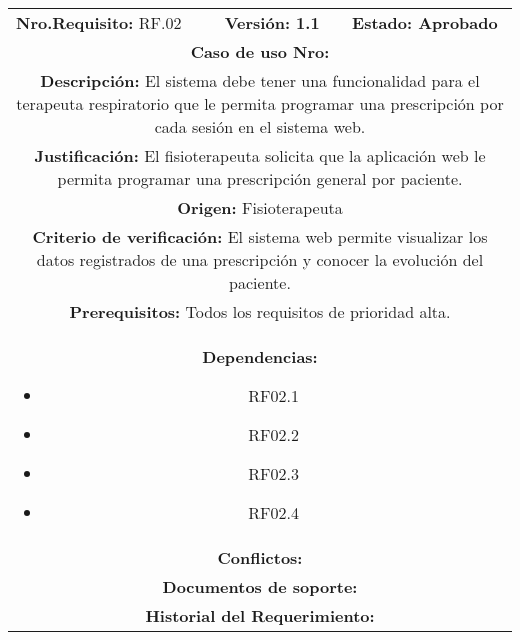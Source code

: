 \begin{center}
        
        \medskip
        
        
        
        
        \begin{tabular}{|c|c|p{4cm}|p{4cm}|}
            \hline
            \rowcolor{red} \multicolumn{4}{|c|}{\textbf{Prioridad:} Alta}  \\
            \hline
            \multicolumn{2}{|l}{\textbf{Nro.Requisito: }RF.02} & \multicolumn{1}{|l}{\textbf{Versión: 1.1}} & \multicolumn{1}{|l|}{\textbf{Estado: Aprobado}} \\
            \multicolumn{4}{|p{13cm}|}{\textbf{Caso de uso Nro: }}  \\
            \hline
            \multicolumn{4}{|p{13cm}|}{\textbf{Descripción: } El sistema debe tener una funcionalidad para el terapeuta respiratorio que le permita programar una prescripción por cada sesión en el sistema web. } \\
            \multicolumn{4}{|p{13cm}|}{\textbf{Justificación: } El fisioterapeuta solicita que la aplicación web le permita programar una prescripción general por paciente.} \\ 
            \multicolumn{4}{|p{13cm}|}{\textbf{Origen: }Fisioterapeuta}  \\
            \multicolumn{4}{|p{13cm}|}{\textbf{Criterio de verificación: } El sistema web permite visualizar los datos registrados de una prescripción y conocer la evolución del paciente.  } \\
            \hline
            \multicolumn{4}{|p{13cm}|}{\textbf{Prerequisitos: } Todos los requisitos de prioridad alta. }\\
            \hline \multicolumn{4}{|p{12cm}|}{\textbf{Dependencias: }
                \begin{itemize}
                \item RF02.1
                \item RF02.2
                \item RF02.3
                \item RF02.4
                \end{itemize}}  \\
            \multicolumn{4}{|p{12cm}|}{\textbf{Conflictos: }}  \\
            \hline
            \multicolumn{4}{|p{12cm}|}{\textbf{Documentos de soporte: }}  \\
            \hline
            \multicolumn{4}{|p{12cm}|}{\textbf{Historial del Requerimiento: }}  \\

\end{tabular}
\end{center}
